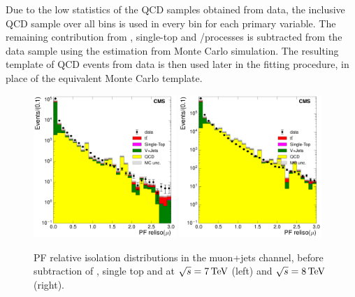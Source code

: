 Due to the low statistics of the QCD samples obtained from data, the inclusive QCD sample over all
bins is used in every bin for each primary variable. The remaining contribution from \ttbar,
single-top and \W/\ZpJets processes is subtracted from the data sample using the estimation from
Monte Carlo simulation. The resulting template of QCD events from data is then used later in the fitting
procedure, in place of the equivalent Monte Carlo template.

\begin{figure}[hbtp]
    \centering
      \includegraphics[width=0.48\textwidth]{Chapters/04_Analysis/04b_XSections/images/control_plots/before_fit/7TeV/qcd_plots/QCD_muon_pfIsolation_0btag}\hfill
      \includegraphics[width=0.48\textwidth]{Chapters/04_Analysis/04b_XSections/images/control_plots/before_fit/8TeV/qcd_plots/QCD_muon_pfIsolation_0btag}\\
      \caption[PF relative isolation distributions in the muon+jets channel at $\roots=7\TeV$ and
      $\roots=8\TeV$]{PF relative isolation distributions in the muon+jets channel, before subtraction of
      \ttbar, single top and \VpJets at $\roots=7\TeV$ (left) and $\roots=8\TeV$ (right).}
     \label{fig:muon_qcd_isolation}
\end{figure}

